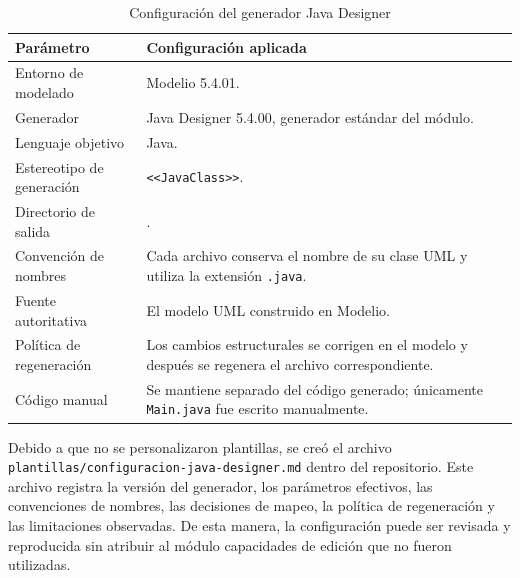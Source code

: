 \documentclass[10pt,a4paper,openany]{report}
\renewcommand{\arraystretch}{1.15}
\begin{document}
	\begin{table}[H]
		\centering
		\caption{Configuración del generador Java Designer}
		\label{tab:configuracion-generador}
		\footnotesize
		\renewcommand{\arraystretch}{1.05}
		
		\begin{tabularx}{\textwidth}{|p{4.4cm}|Y|}
			\hline
			\textbf{Parámetro} &
			\textbf{Configuración aplicada} \\
			\hline
			
			Entorno de modelado &
			Modelio 5.4.01. \\
			\hline
			
			Generador &
			Java Designer 5.4.00, generador estándar del módulo. \\
			\hline
			
			Lenguaje objetivo &
			Java. \\
			\hline
			
			Estereotipo de generación &
			\texttt{\textless\textless JavaClass\textgreater\textgreater}. \\
			\hline
			
			Directorio de salida &
			. \\
			\hline
			
			Convención de nombres &
			Cada archivo conserva el nombre de su clase UML y utiliza la
			extensión \texttt{.java}. \\
			\hline
			
			Fuente autoritativa &
			El modelo UML construido en Modelio. \\
			\hline
			
			Política de regeneración &
			Los cambios estructurales se corrigen en el modelo y después se
			regenera el archivo correspondiente. \\
			\hline
			
			Código manual &
			Se mantiene separado del código generado; únicamente
			\texttt{Main.java} fue escrito manualmente. \\
			\hline
		\end{tabularx}
	\end{table}
	
	Debido a que no se personalizaron plantillas, se creó el archivo
	\texttt{plantillas/configuracion-java-designer.md} dentro del repositorio.
	Este archivo registra la versión del generador, los parámetros efectivos,
	las convenciones de nombres, las decisiones de mapeo, la política de
	regeneración y las limitaciones observadas. De esta manera, la
	configuración puede ser revisada y reproducida sin atribuir al módulo
	capacidades de edición que no fueron utilizadas.
	
\end{document}
